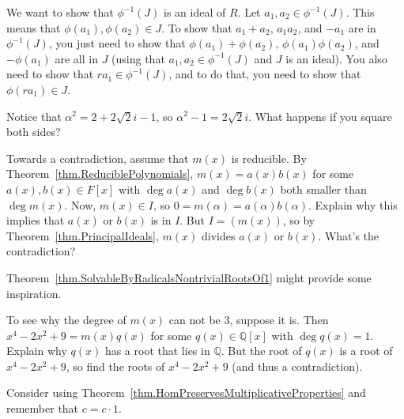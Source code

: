 \begin{hint*}
We want to show that $\phi^{-1}(J)$ is an ideal of $R$. Let $a_1,a_2\in \phi^{-1}(J)$. This means that $\phi(a_1),\phi(a_2)\in J$. To show that $a_1+a_2$, $a_1a_2$, and $-a_1$ are in $\phi^{-1}(J)$, you just need to show that $\phi(a_1)+\phi(a_2)$, $\phi(a_1)\phi(a_2)$, and $-\phi(a_1)$ are all in $J$ (using that $a_1,a_2\in \phi^{-1}(J)$ and $J$ is an ideal). You also need to show that $ra_1\in \phi^{-1}(J)$, and to do that, you need to show that  $\phi(ra_1)\in J$.
\end{hint*}


\begin{hint*}
Notice that $\alpha^2 = 2 + 2\sqrt{2}i -1$, so $\alpha^2 -1 = 2\sqrt{2}i$. What happens if you square both sides?
\end{hint*}

\begin{hint*}
Towards a contradiction, assume that $m(x)$ is reducible. By Theorem~\ref{thm.ReduciblePolynomials}, $m(x) = a(x)b(x)$ for some $a(x),b(x)\in F[x]$ with $\deg a(x)$ and $\deg b(x)$ both smaller than $\deg m(x)$. Now, $m(x)\in I$, so $0 = m(\alpha) = a(\alpha)b(\alpha)$. Explain why this implies that $a(x)$ or $b(x)$ is in $I$. But $I = (m(x))$, so by Theorem~\ref{thm.PrincipalIdeals}, $m(x)$ divides $a(x)$ or $b(x)$. What's the contradiction?
\end{hint*}

\begin{hint*}
Theorem~\ref{thm.SolvableByRadicalsNontrivialRootsOf1} might provide some inspiration.
\end{hint*}

\begin{hint*}
To see why the degree of $m(x)$ can not be $3$, suppose it is. Then $x^4-2x^2+9 = m(x)q(x)$ for some $q(x)\in\mathbb{Q}[x]$ with $\deg q(x) = 1$. Explain why $q(x)$ has a root that lies in $\mathbb{Q}$. But the root of  $q(x)$ is a root of $x^4-2x^2+9$, so find the roots of $x^4-2x^2+9$ (and thus a contradiction).
\end{hint*}

\begin{hint*}
Consider using Theorem~\ref{thm.HomPreservesMultiplicativeProperties} and remember that $c = c\cdot1$.
\end{hint*}

